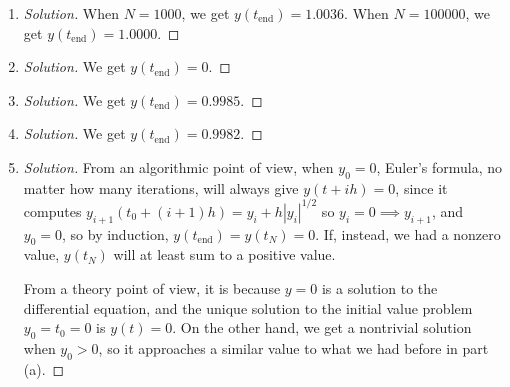\documentclass{article}
\begin{document}
\begin{enumerate}
	\item \begin{proof}[Solution]\let\qed\relax
		When $N = 1000$, we get $y(t_{\mathrm{end}}) = 1.0036$.
		When $N = 100000$, we get $y(t_{\mathrm{end}}) = 1.0000$.
	\end{proof}
	\item \begin{proof}[Solution]\let\qed\relax
		We get $y(t_{\mathrm{end}}) = 0$.
	\end{proof}
	\item \begin{proof}[Solution]\let\qed\relax
		We get $y(t_{\mathrm{end}}) = 0.9985$.
	\end{proof}
	\item \begin{proof}[Solution]\let\qed\relax
		We get $y(t_{\mathrm{end}}) = 0.9982$.
	\end{proof}
	\item \begin{proof}[Solution]\let\qed\relax
		From an algorithmic point of view,
		when $y_0 = 0$, Euler's formula, no matter how many iterations,
		will always give $y(t+ih) = 0$,
		since it computes $y_{i+1}(t_0+(i+1)h) = y_{i} + h|y_{i}|^{1/2}$
		so $y_{i} = 0 \implies y_{i+1}$,
		and $y_0 = 0$, so by induction, $y(t_{\mathrm{end}}) = y(t_N) = 0$.
		If, instead, we had a nonzero value,
		$y(t_N)$ will at least sum to a positive value.

		From a theory point of view, it is because $y = 0$ is a solution to the differential equation,
		and the unique solution to the initial value problem $y_0 = t_0 = 0$ is $y(t) = 0$.
		On the other hand, we get a nontrivial solution when $y_0 > 0$,
		so it approaches a similar value to what we had before in part (a).
	\end{proof}
\end{enumerate}
\end{document}
